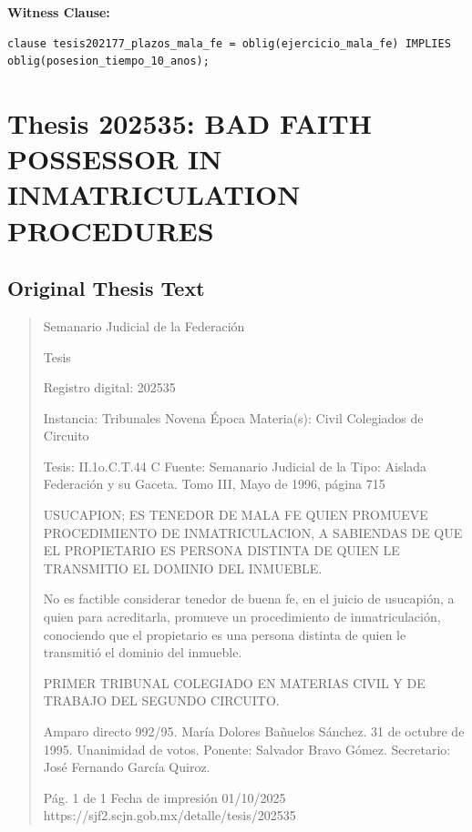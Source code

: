 \documentclass[11pt,a4paper]{article}
\begin{document}
\textbf{Witness Clause:}

\begin{lstlisting}[style=witnessstyle, language=Witness]
clause tesis202177_plazos_mala_fe = oblig(ejercicio_mala_fe) IMPLIES oblig(posesion_tiempo_10_anos);
\end{lstlisting}

\newpage

\section{Thesis 202535: BAD FAITH POSSESSOR IN INMATRICULATION PROCEDURES}
\label{thesis:202535}

\subsection{Original Thesis Text}

\begin{quote}
                                                   Semanario Judicial de la Federación

                                                  Tesis

 Registro digital: 202535

 Instancia: Tribunales            Novena Época                        Materia(s): Civil
 Colegiados de Circuito

 Tesis: II.1o.C.T.44 C            Fuente: Semanario Judicial de la   Tipo: Aislada
                                  Federación y su Gaceta.
                                  Tomo III, Mayo de 1996, página 715


USUCAPION; ES TENEDOR DE MALA FE QUIEN PROMUEVE PROCEDIMIENTO DE
INMATRICULACION, A SABIENDAS DE QUE EL PROPIETARIO ES PERSONA DISTINTA DE
QUIEN LE TRANSMITIO EL DOMINIO DEL INMUEBLE.


No es factible considerar tenedor de buena fe, en el juicio de usucapión, a quien para acreditarla,
promueve un procedimiento de inmatriculación, conociendo que el propietario es una persona
distinta de quien le transmitió el dominio del inmueble.

PRIMER TRIBUNAL COLEGIADO EN MATERIAS CIVIL Y DE TRABAJO DEL SEGUNDO
CIRCUITO.


Amparo directo 992/95. María Dolores Bañuelos Sánchez. 31 de octubre de 1995. Unanimidad de
votos. Ponente: Salvador Bravo Gómez. Secretario: José Fernando García Quiroz.




                                             Pág. 1 de 1           Fecha de impresión 01/10/2025
  https://sjf2.scjn.gob.mx/detalle/tesis/202535

\end{quote}
\end{document}
